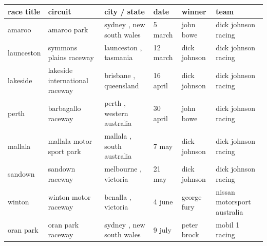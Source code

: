 \documentclass{article}
\begin{document}
\begin{tabular}{llllll}
\toprule
race title & circuit & city / state & date & winner & team \\
\midrule
amaroo & amaroo park & sydney , new south wales & 5 march & john bowe & dick johnson racing \\
launceston & symmons plains raceway & launceston , tasmania & 12 march & dick johnson & dick johnson racing \\
lakeside & lakeside international raceway & brisbane , queensland & 16 april & dick johnson & dick johnson racing \\
perth & barbagallo raceway & perth , western australia & 30 april & john bowe & dick johnson racing \\
mallala & mallala motor sport park & mallala , south australia & 7 may & dick johnson & dick johnson racing \\
sandown & sandown raceway & melbourne , victoria & 21 may & dick johnson & dick johnson racing \\
winton & winton motor raceway & benalla , victoria & 4 june & george fury & nissan motorsport australia \\
oran park & oran park raceway & sydney , new south wales & 9 july & peter brock & mobil 1 racing \\
\bottomrule
\end{tabular}
\end{document}
